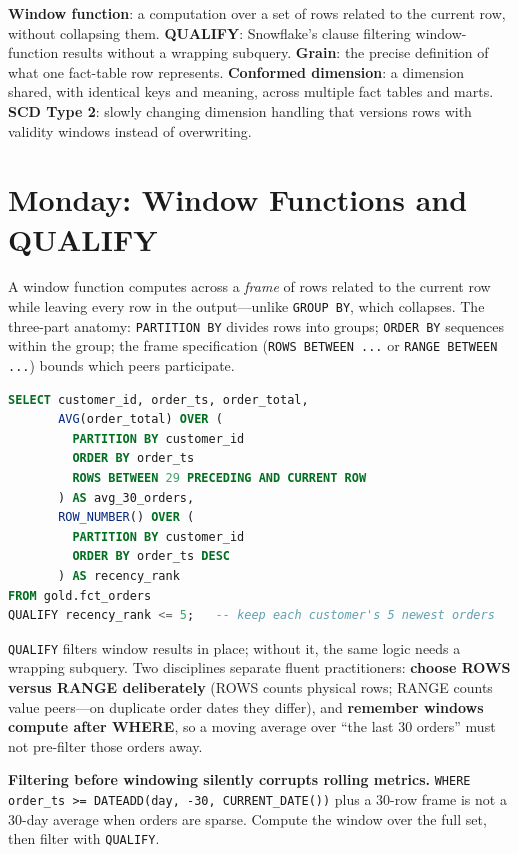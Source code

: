 \begin{keyterms}
\textbf{Window function}: a computation over a set of rows related to the current row, without collapsing them.\quad
\textbf{QUALIFY}: Snowflake's clause filtering window-function results without a wrapping subquery.\quad
\textbf{Grain}: the precise definition of what one fact-table row represents.\quad
\textbf{Conformed dimension}: a dimension shared, with identical keys and meaning, across multiple fact tables and marts.\quad
\textbf{SCD Type 2}: slowly changing dimension handling that versions rows with validity windows instead of overwriting.
\end{keyterms}

\section{Monday: Window Functions and QUALIFY}
A window function computes across a \emph{frame} of rows related to the current row while leaving every row in the output---unlike \texttt{GROUP BY}, which collapses. The three-part anatomy: \texttt{PARTITION BY} divides rows into groups; \texttt{ORDER BY} sequences within the group; the frame specification (\texttt{ROWS BETWEEN ...} or \texttt{RANGE BETWEEN ...}) bounds which peers participate.

\begin{lstlisting}[language=SQL, caption={Moving average and ranking with QUALIFY}]
SELECT customer_id, order_ts, order_total,
       AVG(order_total) OVER (
         PARTITION BY customer_id
         ORDER BY order_ts
         ROWS BETWEEN 29 PRECEDING AND CURRENT ROW
       ) AS avg_30_orders,
       ROW_NUMBER() OVER (
         PARTITION BY customer_id
         ORDER BY order_ts DESC
       ) AS recency_rank
FROM gold.fct_orders
QUALIFY recency_rank <= 5;   -- keep each customer's 5 newest orders
\end{lstlisting}

\texttt{QUALIFY} filters window results in place; without it, the same logic needs a wrapping subquery. Two disciplines separate fluent practitioners: \textbf{choose ROWS versus RANGE deliberately} (ROWS counts physical rows; RANGE counts value peers---on duplicate order dates they differ), and \textbf{remember windows compute after WHERE}, so a moving average over ``the last 30 orders'' must not pre-filter those orders away.

\begin{pitfall}
\textbf{Filtering before windowing silently corrupts rolling metrics.} \texttt{WHERE order\_ts >= DATEADD(day, -30, CURRENT\_DATE())} plus a 30-row frame is not a 30-day average when orders are sparse. Compute the window over the full set, then filter with \texttt{QUALIFY}.
\end{pitfall}

